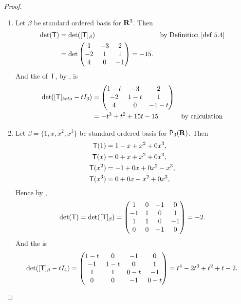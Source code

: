 \begin{proof}
\begin{enumerate}
\item Let \(\beta\) be standard ordered basis for \(\mathbf{R}^3\).
Then
\begin{align*}
    \det(\T) & = \det([\T]_{\beta}) & \text{by \DEF{5.4}} \\
             & = \det \begin{pmatrix} 1 & -3 & 2 \\ -2 & 1 & 1 \\ 4 & 0 & -1 \end{pmatrix} = -15.
\end{align*}
And the \CPOLY{} of \(\textsf{T}\), by , is
\begin{align*}
    \det([\textsf{T}]_{beta} - tI_3) & = \begin{pmatrix} 1-t & -3 & 2 \\ -2 & 1-t & 1 \\ 4 & 0 & -1-t \end{pmatrix} \\
        & = -t^3 + t^2 + 15t - 15 & \text{by calculation}
\end{align*}
\item
Let \(\beta = \{ 1, x, x^2, x^3 \}\) be standard ordered basis for \(\textsf{P}_3(\mathbf{R})\).
Then
\begin{align*}
    \textsf{T}(1) & = 1 - x + x^2 + 0x^3, \\
    \textsf{T}(x) & = 0 + x + x^2 + 0x^3, \\
    \textsf{T}(x^2) & = -1 + 0x + 0x^2 - x^3, \\
    \textsf{T}(x^3) & = 0 + 0x - x^2 + 0x^3,
\end{align*}
Hence by ,
\[
    \det(\textsf{T}) = \det([\textsf{T}]_{\beta}) = \begin{pmatrix}
        1 & 0 & -1 & 0 \\
        -1 & 1 & 0 & 1 \\
        1 & 1 & 0 & -1 \\
        0 & 0 & -1 & 0
    \end{pmatrix} = -2.
\]
And the \CPOLY{} is
\[
    \det([\textsf{T}]_{\beta} - tI_4) = \begin{pmatrix}
        1 - t & 0 & -1 & 0 \\
        -1 & 1 - t & 0 & 1 \\
        1 & 1 & 0 - t & -1 \\
        0 & 0 & -1 & 0 - t
    \end{pmatrix}
    = t^4 - 2t^3 + t^2 + t - 2.
\]


\end{enumerate}
\end{proof}
